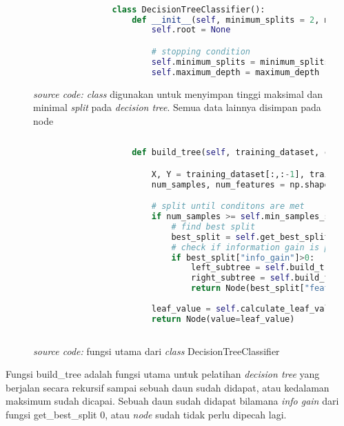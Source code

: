 		\begin{figure}[H]
			\begin{lstlisting}[language=Python, basicstyle=\tiny]

				class DecisionTreeClassifier():
					def __init__(self, minimum_splits = 2, maximum_depth = 2):
						self.root = None

						# stopping condition
						self.minimum_splits = minimum_splits
						self.maximum_depth = maximum_depth

			\end{lstlisting}
			\caption{\emph{source code: class} digunakan untuk menyimpan tinggi maksimal dan minimal 
			\textit{split} pada \emph{decision tree}. Semua data lainnya disimpan pada node}
			\label{code: DecisionTreeClassifier class}
		\end{figure}

		\begin{figure}[H]
			\begin{lstlisting}[language=Python, basicstyle=\tiny]
						
					def build_tree(self, training_dataset, current_depth = 0):

						X, Y = training_dataset[:,:-1], training_dataset[:,-1]
						num_samples, num_features = np.shape(X)

						# split until conditons are met
						if num_samples >= self.min_samples_split and current_depth <= self.max_depth:
							# find best split
							best_split = self.get_best_split(dataset, num_samples, num_features)
							# check if information gain is positive
							if best_split["info_gain"]>0:
								left_subtree = self.build_tree(best_split["dataset_left"], current_depth+1)
								right_subtree = self.build_tree(best_split["dataset_right"], current_depth+1)
								return Node(best_split["feature_index"], best_split["threshold"], left_subtree, right_subtree, best_split["info_gain"])
							
						leaf_value = self.calculate_leaf_value(Y)
						return Node(value=leaf_value)
					
			\end{lstlisting}
			\caption{\emph{source code:} fungsi utama dari \emph{class} DecisionTreeClassifier}
			\label{code: build tree function}
		\end{figure}

		Fungsi build\_tree adalah fungsi utama untuk pelatihan \emph{decision tree} yang berjalan secara 
		rekursif sampai sebuah daun sudah didapat, atau kedalaman maksimum sudah dicapai. 
		Sebuah daun sudah didapat bilamana \textit{info gain} dari fungsi get\_best\_split 0, atau \textit{node} 
		sudah tidak perlu dipecah lagi.


